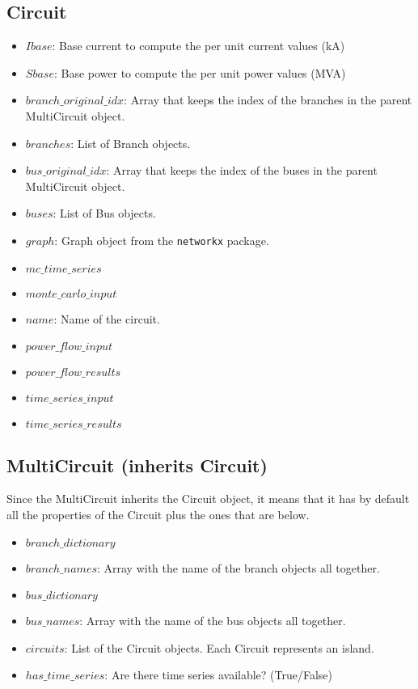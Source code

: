 \documentclass[11pt,fleqn]{book} %
\begin{document}
\subsection{Circuit}

\begin{itemize}
	\item $Ibase$: Base current to compute the per unit current values (kA)
	\item $Sbase$: Base power to compute the per unit power values (MVA)
	\item $branch\_original\_idx$: Array that keeps the index of the branches in the parent MultiCircuit object.
	\item $branches$: List of Branch objects.
	\item $bus\_original\_idx$: Array that keeps the index of the buses in the parent MultiCircuit object.
	\item $buses$: List of Bus objects.
	\item $graph$: Graph object from the \verb|networkx| package.
	\item $mc\_time\_series$
	\item $monte\_carlo\_input$
	\item $name$: Name of the circuit.
	\item $power\_flow\_input$
	\item $power\_flow\_results$
	\item $time\_series\_input$
	\item $time\_series\_results$
\end{itemize}


\subsection{MultiCircuit (inherits Circuit)}

Since the MultiCircuit inherits the Circuit object, it means that it has by default all the properties of the Circuit plus the ones that are below.

\begin{itemize}
	\item $branch\_dictionary$
	\item $branch\_names$: Array with the name of the branch objects all together.
	\item $bus\_dictionary$
	\item $bus\_names$: Array with the name of the bus objects all together.
	\item $circuits$: List of the Circuit objects. Each Circuit represents an island.
	\item $has\_time\_series$: Are there time series available? (True/False)
\end{itemize}
\end{document}
